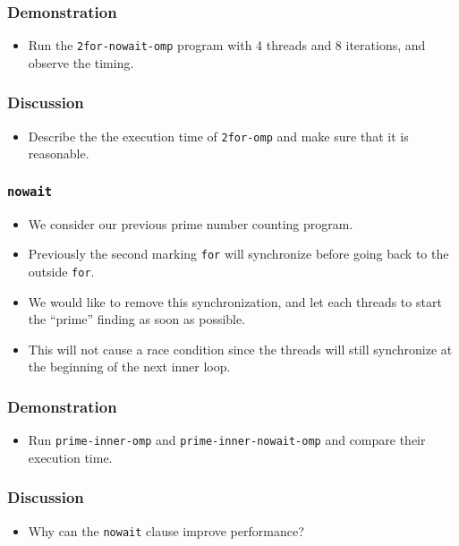 \documentclass{beamer}
\begin{document}
\begin{frame}
  \frametitle{Demonstration}
  \begin{itemize}
  \item Run the {\tt 2for-nowait-omp} program with 4 threads and 8
    iterations, and observe the timing.
  \end{itemize}
\end{frame}

\begin{frame}
  \frametitle{Discussion}
  \begin{itemize}
  \item Describe the the execution time of {\tt 2for-omp} and make
    sure that it is reasonable.
  \end{itemize}
\end{frame}

\begin{frame}
\frametitle{\tt nowait}
\begin{itemize}
\item We consider our previous prime number counting program.
\item Previously the second marking {\tt for} will synchronize before
  going back to the outside {\tt for}.
\item We would like to remove this synchronization, and let each
  threads to start the ``prime'' finding as soon as possible.
\item This will not cause a race condition since the threads will
  still synchronize at the beginning of the next inner loop.
\end{itemize}
\end{frame}

\begin{frame}
\end{frame}

\begin{frame}
  \frametitle{Demonstration}
  \begin{itemize}
  \item Run {\tt prime-inner-omp} and {\tt prime-inner-nowait-omp} and
    compare their execution time.
  \end{itemize}
\end{frame}

\begin{frame}
  \frametitle{Discussion}
  \begin{itemize}
  \item Why can the {\tt nowait} clause improve performance?
  \end{itemize}
\end{frame}
\end{document}
